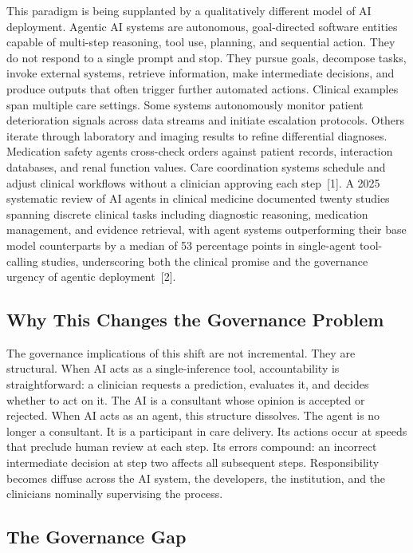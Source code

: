 \documentclass[11pt]{article}
\begin{document}
This paradigm is being supplanted by a qualitatively different model of
AI deployment. Agentic AI systems are autonomous, goal-directed software
entities capable of multi-step reasoning, tool use, planning, and
sequential action. They do not respond to a single prompt and stop. They
pursue goals, decompose tasks, invoke external systems, retrieve
information, make intermediate decisions, and produce outputs that often
trigger further automated actions. Clinical examples span multiple care
settings. Some systems autonomously monitor patient deterioration
signals across data streams and initiate escalation protocols. Others
iterate through laboratory and imaging results to refine differential
diagnoses. Medication safety agents cross-check orders against patient
records, interaction databases, and renal function values. Care
coordination systems schedule and adjust clinical workflows without a
clinician approving each step~{[}1{]}. A 2025 systematic review of AI
agents in clinical medicine documented twenty studies spanning discrete
clinical tasks including diagnostic reasoning, medication management,
and evidence retrieval, with agent systems outperforming their base
model counterparts by a median of 53 percentage points in single-agent
tool-calling studies, underscoring both the clinical promise and the
governance urgency of agentic deployment~{[}2{]}.

\subsection{Why This Changes the Governance
Problem}\label{why-this-changes-the-governance-problem}

The governance implications of this shift are not incremental. They are
structural. When AI acts as a single-inference tool, accountability is
straightforward: a clinician requests a prediction, evaluates it, and
decides whether to act on it. The AI is a consultant whose opinion is
accepted or rejected. When AI acts as an agent, this structure
dissolves. The agent is no longer a consultant. It is a participant in
care delivery. Its actions occur at speeds that preclude human review at
each step. Its errors compound: an incorrect intermediate decision at
step two affects all subsequent steps. Responsibility becomes diffuse
across the AI system, the developers, the institution, and the
clinicians nominally supervising the process.

\subsection{The Governance Gap}\label{the-governance-gap}
\end{document}
